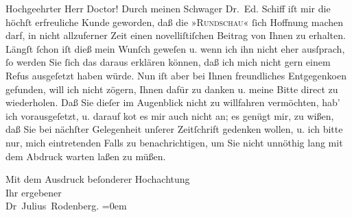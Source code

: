 \pstart{}Hochgeehrter Herr Doctor!\pend\vspace{0.5em}
\pstart
           Durch meinen Schwager Dr. Ed. Schiff iſt mir
               die höchſt erfreuliche Kunde geworden, daß die »\textsc{Rundschau}« ſich Hoffnung machen darf, in nicht allzuferner Zeit einen novelliſtiſchen
               Beitrag von Ihnen zu erhalten. Längſt ſchon iſt dieß mein Wunſch geweſen u. wenn ich
               ihn nicht eher ausſprach, ſo werden Sie ſich das daraus erklären können, daß ich mich
               nicht gern einem Refus ausgeſetzt haben würde. Nun iſt aber bei Ihnen freundliches
                  Entgegenko{\geminationm}en gefunden, will ich nicht zögern, Ihnen
               dafür zu danken u. meine Bitte direct zu wiederholen. Daß Sie dieſer im Augenblick
               nicht zu willfahren vermöchten, hab’ ich vorausgeſetzt, u. darauf ko{\geminationm}t es mir auch nicht an; es genügt mir, zu wißen, daß
               Sie bei nächſter Gelegenheit unſerer Zeitſchrift gedenken wollen, u. {\pb}ich bitte nur, mich eintretenden Falls zu
               benachrichtigen, um Sie nicht unnöthig lang mit dem Abdruck warten laßen zu
               müßen.\pend
           
\pstart
           Mit dem Ausdruck beſonderer Hochachtung{\\[\baselineskip]}Ihr ergebener{\\[\baselineskip]}\spacefill\mbox{Dr Julius Rodenberg.}\pend
           \leftskip=0em{}\endnumbering{}  
      